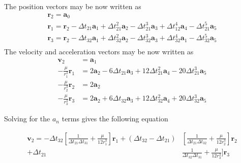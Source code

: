 \documentclass[12pt]{article}
\begin{document}
	The position vectors may be now written as 
	\begin{equation}
	\begin{array} { l }
	{ \mathbf { r } _ { 2 } = \mathbf { a } _ { 0 } } \\ 
	 { \mathbf { r } _ { 1 } = \mathbf { r } _ { 2 } - \Delta t _ { 21 } \mathbf { a } _ { 1 } + \Delta t _ { 21 } ^ { 2 } \mathbf { a } _ { 2 } - \Delta t _ { 21 } ^ { 3 } \mathbf { a } _ { 3 } + \Delta t _ { 12 } ^ { 4 } \mathbf { a } _ { 4 } - \Delta t _ { 21 } ^ { 5 } \mathbf { a } _ { 5 } } \\ 
	
	{ \mathbf { r } _ { 3 } = \mathbf { r } _ { 2 } - \Delta t _ { 32 } \mathbf { a } _ { 1 } + \Delta t _ { 32 } ^ { 2 } \mathbf { a } _ { 2 } - \Delta t _ { 32 } ^ { 3 } \mathbf { a } _ { 3 } + \Delta t _ { 32 } ^ { 4 } \mathbf { a } _ { 1 } - \Delta t _ { 32 } ^ { 5 } \mathbf { a } _ { 5 } } \\ 	
	\end{array}
	\end{equation}
	The velocity and acceleration vectors may be now written as
	 \begin{equation}
	 \begin{aligned} \mathbf { v } _ { 2 } & = \mathbf { a } _ { 1 } \\ - \frac { \mu } { r _ { 1 } ^ { 3 } } \mathbf { r } _ { 1 } & = 2 \mathbf { a } _ { 2 } - 6 \Delta t _ { 21 } \mathbf { a } _ { 3 } + 12 \Delta t _ { 21 } ^ { 2 } \mathbf { a } _ { 4 } - 20 \Delta t _ { 21 } ^ { 3 } \mathbf { a } _ { 5 } \\ - \frac { \mu } { r _ { 2 } ^ { 3 } } \mathbf { r } _ { 2 } & = 2 \mathbf { a } _ { 2 } \\ - \frac { \mu } { r _ { 3 } ^ { 3 } } \mathbf { r } _ { 3 } & = 2 \mathbf { a } _ { 2 } + 6 \Delta t _ { 32 } \mathbf { a } _ { 3 } + 12 \Delta t _ { 32 } ^ { 2 } \mathbf { a } _ { 4 } + 20 \Delta t _ { 32 } ^ { 3 } \mathbf { a } _ { 5 } \end{aligned}
	 \end{equation}
	
	Solving for the $a_n$ terms gives the following equation
	
	\begin{equation}
	\begin{aligned} \mathbf { v } _ { 2 } = - \Delta t _ { 32 } \left[ \frac { 1 } { \Delta t _ { 21 } \Delta t _ { 31 } } + \frac { \mu } { 12 r _ { 1 } ^ { 3 } } \right] \mathbf { r } _ { 1 } + \left( \Delta t _ { 32 } - \Delta t _ { 21 } \right) & \left[ \frac { 1 } { \Delta t _ { 21 } \Delta t _ { 32 } } + \frac { \mu } { 12 r _ { 2 } ^ { 3 } } \right] \mathbf { r } _ { 2 } \\ + \Delta t _ { 21 } & \frac { 1 } { \Delta t _ { 32 } \Delta t _ { 31 } } + \frac { \mu } { 12 r _ { 3 } ^ { 3 } } ] \mathbf { r } _ { 3 } \end{aligned}
	\end{equation}
	
\end{document}
